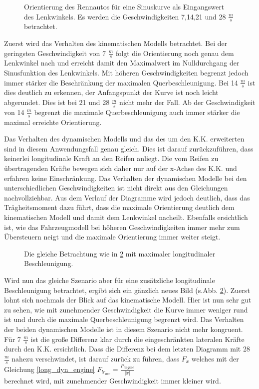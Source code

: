 \documentclass{like}
\begin{document}
\begin{figure}
	\centering
	 
	\caption{Orientierung des Rennautos für eine Sinuskurve als Eingangswert des Lenkwinkels. Es werden die Geschwindigkeiten 7,14,21 und 28 $\frac{m}{s}$ betrachtet.}
	\label{fig:modelDiffOrient}
\end{figure}

Zuerst wird das Verhalten des kinematischen Modells betrachtet. Bei der geringsten Geschwindigkeit von 7 $\frac{m}{s}$ folgt die Orientierung noch genau dem Lenkwinkel nach und erreicht damit den Maximalwert im Nulldurchgang der Sinusfunktion des Lenkwinkels. Mit höheren Geschwindigkeiten begrenzt jedoch immer stärker die Beschränkung der maximalen Querbeschleunigung. Bei 14 $\frac{m}{s}$ ist dies deutlich zu erkennen, der Anfangspunkt der Kurve ist noch leicht abgerundet. Dies ist bei 21 und 28 $\frac{m}{s}$ nicht mehr der Fall. Ab der Geschwindigkeit von 14 $\frac{m}{s}$ begrenzt die maximale Querbeschleunigung auch immer stärker die maximal erreichte Orientierung. 

Das Verhalten des dynamischen Modells und das des um den \ac{K.K.} erweiterten sind in diesem Anwendungsfall genau gleich. Dies ist darauf zurückzuführen, dass keinerlei longitudinale Kraft an den Reifen anliegt. Die vom Reifen zu übertragenden Kräfte bewegen sich daher nur auf der x-Achse des \ac{K.K.} und erfahren keine Einschränkung. 
Das Verhalten der dynamischen Modelle bei den unterschiedlichen Geschwindigkeiten ist nicht direkt aus den Gleichungen nachvollziehbar. Aus dem Verlauf der Diagramme wird jedoch deutlich, dass das Trägheitsmoment dazu führt, dass die maximale Orientierung deutlich dem kinematischen Modell und damit dem Lenkwinkel nacheilt. Ebenfalls ersichtlich ist, wie das Fahrzeugmodell bei höheren Geschwindigkeiten immer mehr zum Übersteuern neigt und die maximale Orientierung immer weiter steigt.  

\begin{figure}
	\centering
	 
	\caption{Die gleiche Betrachtung wie in \ref{fig:modelDiffOrientMaxAcc} mit maximaler longitudinaler Beschleunigung.}
	\label{fig:modelDiffOrientMaxAcc}
\end{figure}


Wird nun das gleiche Szenario aber für eine zusätzliche longitudinale Beschleunigung betrachtet, ergibt sich ein gänzlich neues Bild (s.Abb. \ref{fig:modelDiffOrientMaxAcc}).
Zuerst lohnt sich nochmals der Blick auf das kinematische Modell. Hier ist nun sehr gut zu sehen, wie mit zunehmender Geschwindigkeit die Kurve immer weniger rund ist und durch die maximale Querbeschleunigung begrenzt wird. Das Verhalten der beiden dynamischen Modelle ist in diesem Szenario nicht mehr kongruent. Für 7 $\frac{m}{s}$ ist die große Differenz klar durch die eingeschränkten lateralen Kräfte durch den \ac{K.K.} ersichtlich. Dass die Differenz bei dem letzten Diagramm mit 28 $\frac{m}{s}$ nahezu verschwindet, ist darauf zurück zu führen, dass $F_x$ welches mit der Gleichung \ref{long_dyn_engine} 
$F_{lr_{acc}} = \frac{P_{engine}}{|\dot{x}|}$\\
berechnet wird, mit zunehmender Geschwindigkeit immer kleiner wird. 
\end{document}
